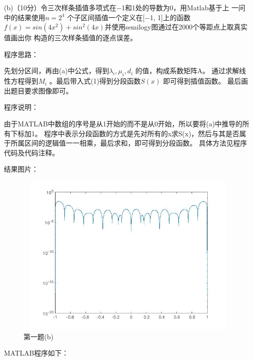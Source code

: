 \documentclass[12pt,a4paper,utf8]{ctexart}
\begin{document}
\begin{enumerate}
(b)（10分）令三次样条插值多项式在−1和1处的导数为0，用Matlab基于上
一问中的结果使用$ n=2^4 $ 个子区间插值一个定义在[−1, 1]上的函数$ f(x) =sin(4x^2) + sin^2(4x) $并使用semilogy图通过在2000个等距点上取真实值画出你
构造的三次样条插值的逐点误差。

程序思路：

先划分区间，再由(a)中公式，得到$ \lambda_i,\mu_i,d_i $ 的值，构成系数矩阵A。
通过求解线性方程得到$ M_i $ 。最后带入式(1)得到分段函数$ S(x) $ 即可得到插值函数。
最后画出题目要求图像即可。

程序说明：

由于MATLAB中数组的序号是从1开始的而不是从0开始，所以要将(a)中推导的所有下标加1。
程序中表示分段函数的方式是先对所有的x求S(x)，然后与其是否属于所属区间的逻辑值一一相乘，最后求和，即可得到分段函数。
具体方法见程序代码及代码注释。

结果图片：

\begin{figure}[htbp]
   \centering
   \includegraphics[width=15cm,height=8cm]{ex1b.jpg}
   \caption{第一题(b)}
\end{figure}

MATLAB程序如下：


\end{enumerate}
\end{document}

